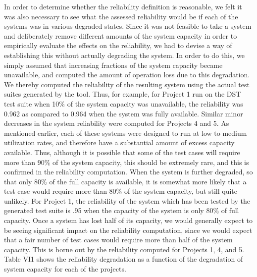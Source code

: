 \documentclass[journal, twoside]{IEEEtran}
\begin{document}
In order to determine whether the reliability definition is
reasonable, we felt it was also necessary to see what the assessed reliability would be if each of the systems was in various degraded states. Since it was not feasible to take a system
and deliberately remove different amounts of the system capacity in order to empirically evaluate the effects on the reliability, we had to devise a way of establishing this without
actually degrading the system. In order to do this, we simply
assumed that increasing fractions of the system capacity became unavailable, and computed the amount of operation loss
due to this degradation. We thereby computed the reliability of
the resulting system using the actual test suites generated by
the tool. Thus, for example, for Project 1 run on the DST test
suite when 10\% of the system capacity was unavailable, the
reliability was 0.962 as compared to 0.964 when the system
was fully available. Similar minor decreases in the system reliability were computed for Projects 4 and 5. As mentioned earlier, each of these systems were designed to run at low to medium utilization rates, and therefore have a substantial amount
of excess capacity available. Thus, although it is possible that
some of the test cases will require more than 90\% of the system capacity, this should be extremely rare, and this is confirmed in the reliability computation. When the system is further degraded, so that only 80\% of the full capacity is available, it is somewhat more likely that a test case would require
more than 80\% of the system capacity, but still quite unlikely.
For Project 1, the reliability of the system which has been
tested by the generated test suite is .95 when the capacity of
the system is only 80\% of full capacity. Once a system has lost
half of its capacity, we would generally expect to be seeing
significant impact on the reliability computation, since we
would expect that a fair number of test cases would require
more than half of the system capacity. This is borne out by the
reliability computed for Projects 1, 4, and 5. Table VI1 shows
the reliability degradation as a function of the degradation of
system capacity for each of the projects. 
\end{document}
